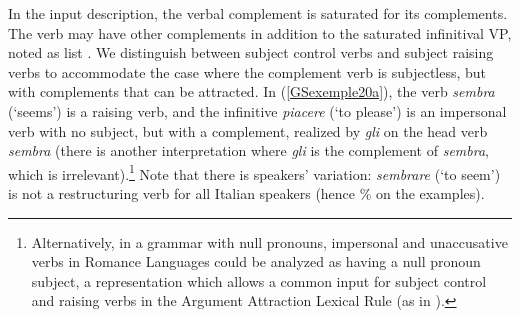 \documentclass[output=paper
	        ,collection
	        ,collectionchapter
 	        ,biblatex
                ,babelshorthands
                ,newtxmath
                ,draftmode
                ,colorlinks, citecolor=brown
]{langscibook}
\begin{document}
{\begin{exe}
\begin{xlist}
	\end{xlist}
\end{exe}

In the input description, the verbal complement is saturated for its complements. The verb may have other complements in addition to the saturated infinitival VP, noted as list . We distinguish between subject control verbs and subject raising verbs to accommodate the case where the complement verb is subjectless, but with complements that can be attracted. In (\ref{GSexemple20a}), the verb \emph{sembra} (`seems') is a raising verb, and the infinitive \emph{piacere} (`to please') is an impersonal verb with no subject, but with a complement, realized by \emph{gli} on the head verb \emph{sembra} (there is another interpretation where \emph{gli} is the complement of \emph{sembra}, which is irrelevant).\footnote{Alternatively, in a grammar with null pronouns, impersonal and unaccusative verbs in Romance Languages could be analyzed as having a null pronoun subject, a representation which allows a common input for subject control and raising verbs in the Argument Attraction Lexical Rule (as in \citealt[331]{Monachesi98a}).} Note that there is speakers' variation: \emph{sembrare} (`to seem') is not a restructuring verb for all Italian speakers (hence \% on the examples).

}
\end{document}
